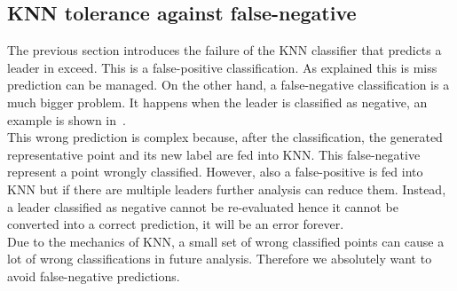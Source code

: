 \subsection{KNN tolerance against false-negative} \label{sec:knnToleranceToFN}
The previous section introduces the failure of the KNN classifier that predicts a leader in exceed. This is a false-positive classification. As explained this is miss prediction can be managed. On the other hand, a false-negative classification is a much bigger problem. It happens when the leader is classified as negative, an example is shown in~.\\
This wrong prediction is complex because, after the classification, the generated representative point and its new label are fed into KNN. This false-negative represent a point wrongly classified. However, also a false-positive is fed into KNN but if there are multiple leaders further analysis can reduce them. Instead, a leader classified as negative cannot be re-evaluated hence it cannot be converted into a correct prediction, it will be an error forever.\\
Due to the mechanics of KNN, a small set of wrong classified points can cause a lot of wrong classifications in future analysis. Therefore we absolutely want to avoid false-negative predictions.
